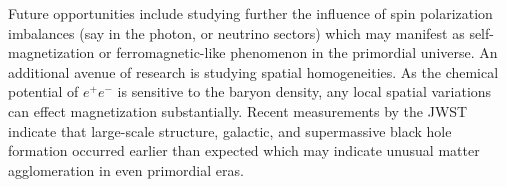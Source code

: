 \documentclass[reprint]{revtex4-2}
\begin{document}
Future opportunities include studying further the influence of spin polarization imbalances (say in the photon, or neutrino sectors) which may manifest as self-magnetization or ferromagnetic-like phenomenon in the primordial universe. An additional avenue of research is studying spatial homogeneities. As the chemical potential of $e^{+}e^{-}$ is sensitive to the baryon density, any local spatial variations can effect magnetization substantially. Recent measurements by the JWST indicate that large-scale structure, galactic, and supermassive black hole formation occurred earlier than expected which may indicate unusual matter agglomeration in even primordial eras.



\end{document}
